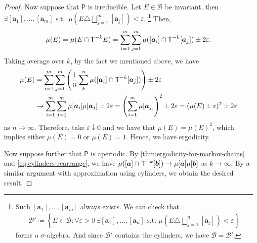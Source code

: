 \documentclass[a4paper]{article}
\begin{document}
\begin{proof}
	Now suppose that $\mathsf{P}$ is irreducible.
	Let $E\in\mathcal{B}$ be invariant,
	then $\exists[\boldsymbol{a}_1],...,[\boldsymbol{a}_m]$ s.t.\ $\mu(E\triangle\bigsqcup_{j=1}^{m}[\boldsymbol{a}_{j}])<\varepsilon$.
	\footnote{
		Such $[\boldsymbol{a}_1],...,[\boldsymbol{a}_m]$ always exists.
		We can check that
		\begin{align*}
			\mathcal{B}' \coloneqq
			\left\{
			E\in\mathcal{B}:
			\forall\varepsilon>0\
			\exists[\boldsymbol{a}_1],...,[\boldsymbol{a}_n]
			\text{ s.t. }
			\mu\left(E\triangle\bigsqcup_{j=1}^{n}[\boldsymbol{a}_{j}]\right)<\varepsilon
			\right\}
		\end{align*}
		forms a $\sigma$-algebra.
		And since $\mathcal{B}'$ contains the cylinders,
		we have $\mathcal{B}=\mathcal{B}'$.
	}
	Then,
	\begin{align*}
		\mu(E)
		= \mu(E\cap \mathsf{T}\inv[k]E)
		= \sum_{i=1}^{m} \sum_{j=1}^{m} \mu([\boldsymbol{a}_i]\cap \mathsf{T}\inv[k][\boldsymbol{a}_j]) \pm 2\varepsilon.
	\end{align*}
	Taking average over $k$, by the fact we mentioned above, we have
	\begin{align*}
		\mu(E)
		&=
		\sum_{i=1}^{m} \sum_{j=1}^{m}
		\left(
		\frac1n \sum_{k}^{n} \mu([\boldsymbol{a}_i]\cap \mathsf{T}\inv[k][\boldsymbol{a}_j])
		\right)
		\pm 2\varepsilon \nonumber\\
		&\to
		\sum_{i=1}^{m} \sum_{j=1}^{m}
		\mu[\boldsymbol{a}_i] \mu[\boldsymbol{a}_j] \pm 2\varepsilon
		= \left( \sum_{i=1}^{m} \mu[\boldsymbol{a}_j] \right)^2 \pm 2\varepsilon
		= (\mu(E)\pm\varepsilon)^2 \pm 2\varepsilon
	\end{align*}
	as $n\to\infty$.
	Therefore,
	take $\varepsilon\downarrow0$ and we have that $\mu(E)=\mu(E)^2$,
	which implies either $\mu(E)=0$ or $\mu(E)=1$.
	Hence, we have ergodicity.

	Now suppose further that $\mathsf{P}$ is aperiodic.
	By \autoref{thm:ergodicity-for-markov-chains} and \eqref{eq:cylinders-rearrange},
	we have
	$\mu([\boldsymbol{a}]\cap\mathsf{T}\inv[k][\boldsymbol{b}])
	\to \mu[\boldsymbol{a}] \mu[\boldsymbol{b}]$ as $k\to\infty$.
	By a similar argument with approximation using cylinders,
	we obtain the desired result.
\end{proof}
\end{document}
